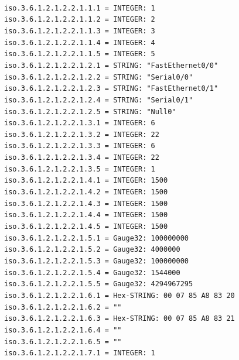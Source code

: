 \documentclass[a4paper,titlepage]{article}
\begin{document}
\begin{center}
	\texttt{\\iso.3.6.1.2.1.2.2.1.1.1 = INTEGER: 1
\\iso.3.6.1.2.1.2.2.1.1.2 = INTEGER: 2
\\iso.3.6.1.2.1.2.2.1.1.3 = INTEGER: 3
\\iso.3.6.1.2.1.2.2.1.1.4 = INTEGER: 4
\\iso.3.6.1.2.1.2.2.1.1.5 = INTEGER: 5
\\iso.3.6.1.2.1.2.2.1.2.1 = STRING: "FastEthernet0/0"
\\iso.3.6.1.2.1.2.2.1.2.2 = STRING: "Serial0/0"
\\iso.3.6.1.2.1.2.2.1.2.3 = STRING: "FastEthernet0/1"
\\iso.3.6.1.2.1.2.2.1.2.4 = STRING: "Serial0/1"
\\iso.3.6.1.2.1.2.2.1.2.5 = STRING: "Null0"
\\iso.3.6.1.2.1.2.2.1.3.1 = INTEGER: 6
\\iso.3.6.1.2.1.2.2.1.3.2 = INTEGER: 22
\\iso.3.6.1.2.1.2.2.1.3.3 = INTEGER: 6
\\iso.3.6.1.2.1.2.2.1.3.4 = INTEGER: 22
\\iso.3.6.1.2.1.2.2.1.3.5 = INTEGER: 1
\\iso.3.6.1.2.1.2.2.1.4.1 = INTEGER: 1500
\\iso.3.6.1.2.1.2.2.1.4.2 = INTEGER: 1500
\\iso.3.6.1.2.1.2.2.1.4.3 = INTEGER: 1500
\\iso.3.6.1.2.1.2.2.1.4.4 = INTEGER: 1500
\\iso.3.6.1.2.1.2.2.1.4.5 = INTEGER: 1500
\\iso.3.6.1.2.1.2.2.1.5.1 = Gauge32: 100000000
\\iso.3.6.1.2.1.2.2.1.5.2 = Gauge32: 4000000
\\iso.3.6.1.2.1.2.2.1.5.3 = Gauge32: 100000000
\\iso.3.6.1.2.1.2.2.1.5.4 = Gauge32: 1544000
\\iso.3.6.1.2.1.2.2.1.5.5 = Gauge32: 4294967295
\\iso.3.6.1.2.1.2.2.1.6.1 = Hex-STRING: 00 07 85 A8 83 20 
\\iso.3.6.1.2.1.2.2.1.6.2 = ""
\\iso.3.6.1.2.1.2.2.1.6.3 = Hex-STRING: 00 07 85 A8 83 21 
\\iso.3.6.1.2.1.2.2.1.6.4 = ""
\\iso.3.6.1.2.1.2.2.1.6.5 = ""
\\iso.3.6.1.2.1.2.2.1.7.1 = INTEGER: 1
}
\end{center}
\end{document}
